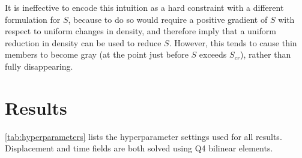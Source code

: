 \documentclass{article}
\begin{document}
It is ineffective to encode this intuition as a hard constraint with a different formulation for $S$, because to do so would require a positive gradient of $S$ with respect to uniform changes in density, and therefore imply that a uniform reduction in density can be used to reduce $S$. However, this tends to cause thin members to become gray (at the point just before $S$ exceeds $S_{cr}$), rather than fully disappearing.

\section{Results}
\autoref{tab:hyperparameters} lists the hyperparameter settings used for all results.
Displacement and time fields are both solved using Q4 bilinear elements.
\end{document}
